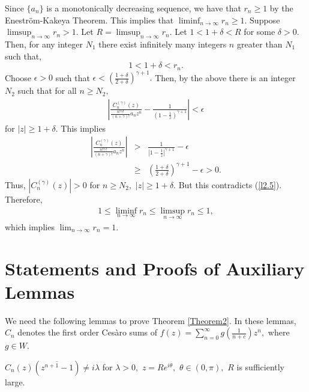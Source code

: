 \documentclass[final]{siamltex}
\begin{document}
\vspace { 4 pt}

Since $\{a_{n}\}$ is a monotonically decreasing sequence, we have that $r_{n} \geq 1$ by the Enestr\"{o}m-Kakeya Theorem. 
 This implies that $\liminf_{n \rightarrow \infty} r_{n} \geq 1.$ 
 Suppose $\limsup_{n \rightarrow \infty} r_{n} > 1.$ Let $R = \limsup_{n \rightarrow \infty} r_{n}.$ 
 Let $1 < 1 + \delta < R$ for some $\delta > 0.$ Then, for any integer $N_{1}$ there exist infinitely many integers $n$ greater than $N_{1}$ such that, 
  \begin{equation} 
\label{l2.5}
  1 < 1 + \delta < r_{n}.  
 \end{equation}
 Choose $\epsilon > 0$ such that $\epsilon < \left( \frac{1+\delta}{2+\delta} \right)^{\gamma +1}.$ Then, by the above there is an integer $N_{2}$ such that for all $n \geq N_{2},$
 \begin{eqnarray*} \left| \frac{ C_{n}^{(\gamma)}(z) }{ \frac{n!\gamma!}{(n+\gamma)!} a_{n}z^{n} } - \frac{1}{(1 - \frac{1}{z})^{\gamma+1} } \right| < \epsilon 
 \end{eqnarray*} for $ |z| \geq 1+\delta.$
 This implies 
 \begin{eqnarray*} \left| \frac{ C_{n}^{(\gamma)}(z) }{ \frac{n!\gamma!}{(n+\gamma)!} a_{n}z^{n} } \right| & > & \frac{1}{ \left| 1 - \frac{1}{z} \right| ^{\gamma + 1} } - \epsilon \\
 & \geq & \left( \frac{1+\delta}{2 + \delta } \right)^{\gamma + 1} - \epsilon  >  0. 
 \end{eqnarray*}
 Thus, $\left| C_{n}^{(\gamma)}(z) \right| > 0$ for $n \geq N_{2},$ $|z| \geq 1 + \delta.$ But this contradicts (\ref{l2.5}).
  Therefore,
  \begin{eqnarray*} 1 \leq \liminf_{n \rightarrow \infty} r_{n} \leq \limsup_{n \rightarrow \infty} r_{n} \leq 1,
 \end{eqnarray*}
 which implies $\lim_{n \rightarrow \infty} r_{n} =1 .$ 


\section{Statements and Proofs of Auxiliary Lemmas}

We need the following lemmas to prove Theorem \ref{Theorem2}. In these lemmas, $C_{n}$ denotes the first order Ces\`{a}ro sums of $f(z) =  \sum_{n=0}^{\infty} g \left( \frac{1}{n+c} \right) z^{n},$ where $g \in W$. 
  
 \begin{lemma} 
\label{Lemma1}
$C_{n}(z) \left( \overline{ z^{n+1} -1} \right) \neq i\lambda$ for $\lambda > 0,$ $z = Re^{i\theta},$ $\theta \in (0, \pi),$ $R$ is sufficiently large. 
\end{lemma}
\end{document}
